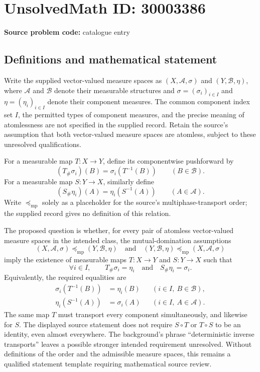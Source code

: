 \documentclass[11pt]{article}
\begin{document}
\section*{UnsolvedMath ID: 30003386}
\textbf{Source problem code:} catalogue entry
\subsection{Definitions and mathematical statement}
Write the supplied vector-valued measure spaces as $(X,\mathcal A,\sigma)$ and $(Y,\mathcal B,\eta)$, where $\mathcal A$ and $\mathcal B$ denote their measurable structures and $\sigma=(\sigma_i)_{i\in I}$ and $\eta=(\eta_i)_{i\in I}$ denote their component measures. The common component index set $I$, the permitted types of component measures, and the precise meaning of atomlessness are not specified in the supplied record. Retain the source's assumption that both vector-valued measure spaces are atomless, subject to these unresolved qualifications.

For a measurable map $T:X\to Y$, define its componentwise pushforward by
\[
(T_\#\sigma_i)(B)=\sigma_i(T^{-1}(B))\qquad(B\in\mathcal B).
\]
For a measurable map $S:Y\to X$, similarly define
\[
(S_\#\eta_i)(A)=\eta_i(S^{-1}(A))\qquad(A\in\mathcal A).
\]
Write $\preceq_{\mathrm{mp}}$ solely as a placeholder for the source's multiphase-transport order; the supplied record gives no definition of this relation.

The proposed question is whether, for every pair of atomless vector-valued measure spaces in the intended class, the mutual-domination assumptions
\[
(X,\mathcal A,\sigma)\preceq_{\mathrm{mp}}(Y,\mathcal B,\eta)
\quad\text{and}\quad
(Y,\mathcal B,\eta)\preceq_{\mathrm{mp}}(X,\mathcal A,\sigma)
\]
imply the existence of measurable maps $T:X\to Y$ and $S:Y\to X$ such that
\[
\forall i\in I,\qquad T_\#\sigma_i=\eta_i\quad\text{and}\quad S_\#\eta_i=\sigma_i.
\]
Equivalently, the required equalities are
\[
\begin{aligned}
\sigma_i(T^{-1}(B))&=\eta_i(B)&& (i\in I,\ B\in\mathcal B),\\
\eta_i(S^{-1}(A))&=\sigma_i(A)&& (i\in I,\ A\in\mathcal A).
\end{aligned}
\]
The same map $T$ must transport every component simultaneously, and likewise for $S$. The displayed source statement does not require $S\circ T$ or $T\circ S$ to be an identity, even almost everywhere. The background's phrase ``deterministic inverse transports'' leaves a possible stronger intended requirement unresolved. Without definitions of the order and the admissible measure spaces, this remains a qualified statement template requiring mathematical source review.
\end{document}
